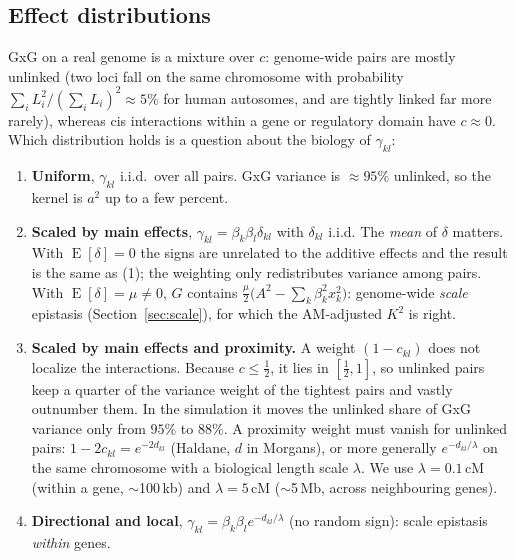 \documentclass[11pt]{article}
\newcommand{\E}{\operatorname{E}}
\begin{document}
\begin{table}[h]\centering\small
\caption{GxG kernel with all interacting pairs at recombination fraction $c$; base $V_{A0}=0.40$,
$V_{G0}=0.20$, $V_E=0.40$ (linked path model). RM: random mating.}\label{tab:linkreal}

\end{table}

\subsection{Effect distributions}
GxG on a real genome is a mixture over $c$: genome-wide pairs are mostly unlinked (two loci fall on the
same chromosome with probability $\sum_iL_i^2/(\sum_iL_i)^2\approx5\%$ for human autosomes, and are tightly
linked far more rarely), whereas cis interactions within a gene or regulatory domain have $c\approx0$. Which
distribution holds is a question about the biology of $\gamma_{kl}$:
\begin{enumerate}
  \item[(1)] \textbf{Uniform}, $\gamma_{kl}$ i.i.d.\ over all pairs. GxG variance is $\approx95\%$
    unlinked, so the kernel is $a^2$ up to a few percent.
  \item[(2)] \textbf{Scaled by main effects}, $\gamma_{kl}=\beta_k\beta_l\delta_{kl}$ with $\delta_{kl}$
    i.i.d. The \emph{mean} of $\delta$ matters. With $\E[\delta]=0$ the signs are unrelated to the additive
    effects and the result is the same as (1); the weighting only redistributes variance among pairs. With
    $\E[\delta]=\mu\ne0$, $G$ contains $\frac\mu2\big(A^2-\sum_k\beta_k^2x_k^2\big)$: genome-wide
    \emph{scale} epistasis (Section~\ref{sec:scale}), for which the AM-adjusted $K^2$ is right.
  \item[(3)] \textbf{Scaled by main effects and proximity.} A weight $(1-c_{kl})$ does not localize
    the interactions. Because $c\le\frac12$, it lies in $[\frac12,1]$, so unlinked pairs keep a quarter of
    the variance weight of the tightest pairs and vastly outnumber them. In the simulation it moves the
    unlinked share of GxG variance only from $95\%$ to $88\%$. A proximity weight must vanish for unlinked
    pairs: $1-2c_{kl}=e^{-2d_{kl}}$ (Haldane, $d$ in Morgans), or more generally $e^{-d_{kl}/\lambda}$ on the
    same chromosome with a biological length scale $\lambda$. We use $\lambda=0.1$\,cM (within a gene,
    $\sim$100\,kb) and $\lambda=5$\,cM ($\sim$5\,Mb, across neighbouring genes).
  \item[(3d)] \textbf{Directional and local}, $\gamma_{kl}=\beta_k\beta_le^{-d_{kl}/\lambda}$ (no random
    sign): scale epistasis \emph{within} genes.
\end{enumerate}
\end{document}
